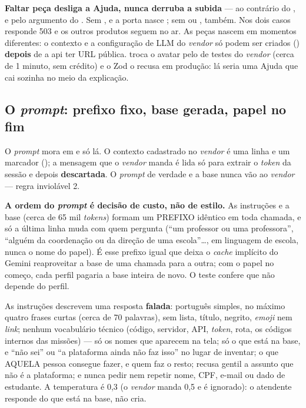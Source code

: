 \begin{decisao}
\textbf{Faltar peça desliga a Ajuda, nunca derruba a subida} --- ao contrário do
, e pelo argumento do .
Sem ,  e
 a porta nasce ; sem
 ou , também. Nos dois casos
 responde 503  e os outros
produtos seguem no ar. As peças nascem em momentos diferentes: o contexto e a
configuração de LLM do \emph{vendor} só podem ser criados
() \textbf{depois} de a api ter URL
pública.  troca o avatar pelo de testes do
\emph{vendor} (cerca de 1 minuto, sem crédito) e o Zod o recusa em produção: lá
seria uma Ajuda que cai sozinha no meio da explicação.
\end{decisao}

\subsection{O \emph{prompt}: prefixo fixo, base gerada, papel no fim}

O \emph{prompt} mora em  e só lá. O contexto
cadastrado no \emph{vendor} é uma linha e um marcador
(); a mensagem
 que o \emph{vendor} manda é lida só para extrair o \emph{token} da
sessão e depois \textbf{descartada}. O \emph{prompt} de verdade e a base nunca
vão ao \emph{vendor} --- regra inviolável 2.

\begin{decisao}
\textbf{A ordem do \emph{prompt} é decisão de custo, não de estilo.} As
instruções e a base (cerca de 65 mil \emph{tokens}) formam um PREFIXO idêntico
em toda chamada, e só a última linha muda com quem pergunta (\enquote{um
professor ou uma professora}, \enquote{alguém da coordenação ou da direção de
uma escola}\ldots, em linguagem de escola, nunca o nome do papel). É esse
prefixo igual que deixa o \emph{cache} implícito do Gemini reaproveitar a base
de uma chamada para a outra; com o papel no começo, cada perfil pagaria a base
inteira de novo. O teste confere que  não depende do
perfil.
\end{decisao}

As instruções descrevem uma resposta \textbf{falada}: português simples, no
máximo quatro frases curtas (cerca de 70 palavras), sem lista, título, negrito,
\emph{emoji} nem \emph{link}; nenhum vocabulário técnico (código, servidor, API,
\emph{token}, rota, os códigos internos das missões) --- só os nomes que
aparecem na tela; só o que está na base, e \enquote{não sei} ou \enquote{a
plataforma ainda não faz isso} no lugar de inventar; o que AQUELA pessoa
consegue fazer, e quem faz o resto; recusa gentil a assunto que não é a
plataforma; e nunca pedir nem repetir nome, CPF, e-mail ou dado de estudante. A
temperatura é 0,3 (o \emph{vendor} manda 0,5 e é ignorado): o atendente responde
do que está na base, não cria.

